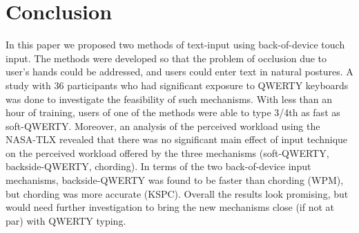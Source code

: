 \section{Conclusion}
In this paper we proposed two methods of text-input using back-of-device touch input. The methods were developed so that the problem of occlusion due to user's hands could be addressed, and users could enter text in natural postures. A study with 36 participants who had significant exposure to QWERTY keyboards was done to investigate the feasibility of such mechanisms. With less than an hour of training, users of one of the methods were able to type 3/4th as fast as soft-QWERTY. Moreover, an analysis of the perceived workload using the NASA-TLX revealed that there was no significant main effect of input technique on the perceived workload offered by the three mechanisms (soft-QWERTY, backside-QWERTY, chording). In terms of the two back-of-device input mechanisms, backside-QWERTY was found to be faster than chording (WPM), but chording was more accurate (KSPC). Overall the results look promising, but would need further investigation to bring the new mechanisms close (if not at par) with QWERTY typing.